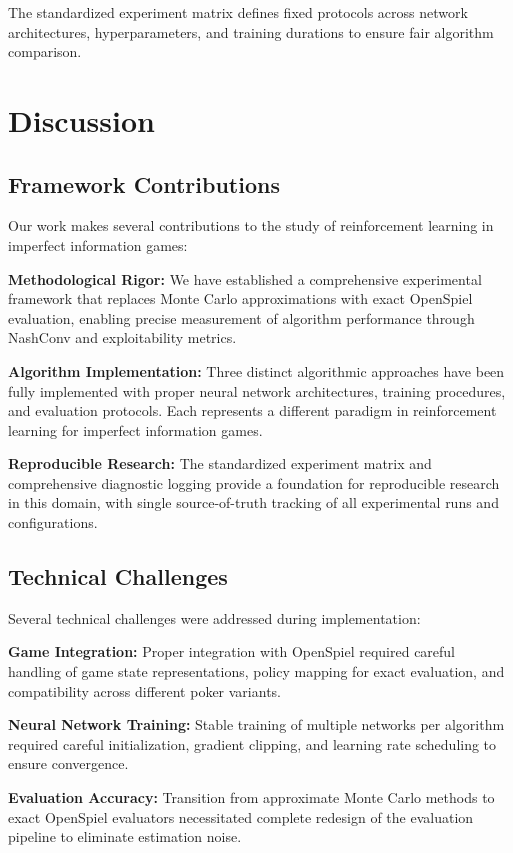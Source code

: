 \documentclass[10pt,twocolumn,conference]{IEEEtran}
\begin{document}
The standardized experiment matrix defines fixed protocols across network architectures, hyperparameters, and training durations to ensure fair algorithm comparison.

\section{Discussion}
\label{sec:discussion}

\subsection{Framework Contributions}
Our work makes several contributions to the study of reinforcement learning in imperfect information games:

\textbf{Methodological Rigor:} We have established a comprehensive experimental framework that replaces Monte Carlo approximations with exact OpenSpiel evaluation, enabling precise measurement of algorithm performance through NashConv and exploitability metrics.

\textbf{Algorithm Implementation:} Three distinct algorithmic approaches have been fully implemented with proper neural network architectures, training procedures, and evaluation protocols. Each represents a different paradigm in reinforcement learning for imperfect information games.

\textbf{Reproducible Research:} The standardized experiment matrix and comprehensive diagnostic logging provide a foundation for reproducible research in this domain, with single source-of-truth tracking of all experimental runs and configurations.

\subsection{Technical Challenges}
Several technical challenges were addressed during implementation:

\textbf{Game Integration:} Proper integration with OpenSpiel required careful handling of game state representations, policy mapping for exact evaluation, and compatibility across different poker variants.

\textbf{Neural Network Training:} Stable training of multiple networks per algorithm required careful initialization, gradient clipping, and learning rate scheduling to ensure convergence.

\textbf{Evaluation Accuracy:} Transition from approximate Monte Carlo methods to exact OpenSpiel evaluators necessitated complete redesign of the evaluation pipeline to eliminate estimation noise.
\end{document}
